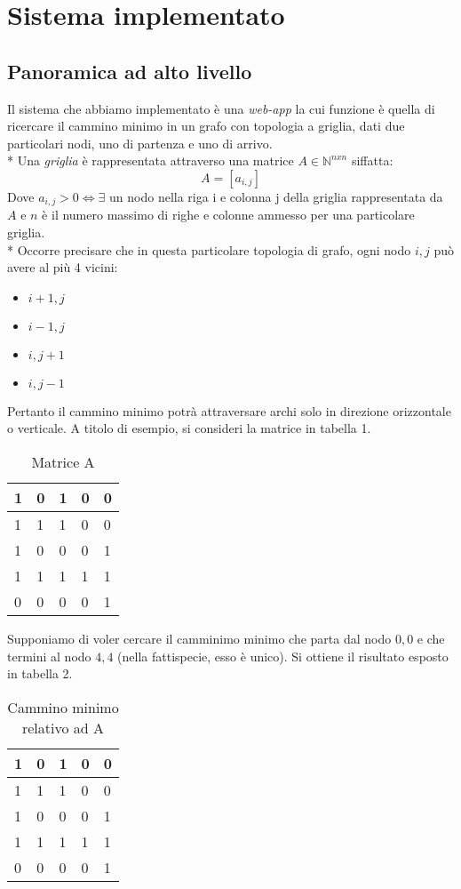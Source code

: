 \chapter{Sistema implementato}
\section{Panoramica ad alto livello}
Il sistema che abbiamo implementato \`e una \emph{web-app} la cui funzione \`e quella di ricercare il cammino minimo in un grafo con topologia a griglia, dati due particolari nodi, uno di partenza e uno di arrivo.\\*
Una \emph{griglia} \`e rappresentata attraverso una matrice $A \in \mathbb{N}^{n x n}$ siffatta:
\[ A=[a_{i,j}] \]
Dove $a_{i,j}>0 \iff \exists $ un nodo nella riga i e colonna j della griglia rappresentata da $A$ e $n$ \`e il numero massimo di righe e colonne ammesso per una particolare griglia.\\*
Occorre precisare che in questa particolare topologia di grafo, ogni nodo $i,j$ pu\`o avere al pi\`u 4 vicini:
\begin{itemize}
	\item $i+1,j$
	\item $i-1,j$
	\item $i,j+1$
	\item $i,j-1$
\end{itemize} 
Pertanto il cammino minimo potr\`a attraversare archi solo in direzione orizzontale o verticale.\newpage
A titolo di esempio, si consideri la matrice in tabella 1.
\begin{table}[]
	\centering
	\caption{Matrice A}
	\label{my-label}
	\begin{tabular}{|l|l|l|l|l|}
		\hline
		1 & 0 & 1 & 0 & 0 \\ \hline
		1 & 1 & 1 & 0 & 0 \\ \hline
		1 & 0 & 0 & 0 & 1 \\ \hline
		1 & 1 & 1 & 1 & 1 \\ \hline
		0 & 0 & 0 & 0 & 1 \\ \hline
	\end{tabular}
\end{table}
Supponiamo di voler cercare il camminimo minimo che parta dal nodo $0,0$ e che termini al nodo $4,4$ (nella fattispecie, esso \`e unico).
Si ottiene il risultato esposto in tabella 2.
\begin{table}[]
	\centering
	\caption{Cammino minimo relativo ad A}
	\label{my-label}
	\begin{tabular}{|l|l|l|l|l|}
		\hline
		\cellcolor[HTML]{68CBD0}1 & 0 & 1 & 0 & 0                         \\ \hline
		\cellcolor[HTML]{68CBD0}1 & 1 & 1 & 0 & 0                         \\ \hline
		\cellcolor[HTML]{68CBD0}1 & 0 & 0 & 0 & 1                         \\ \hline
		\rowcolor[HTML]{68CBD0} 
		1                         & 1 & 1 & 1 & 1                         \\ \hline
		0                         & 0 & 0 & 0 & \cellcolor[HTML]{68CBD0}1 \\ \hline
	\end{tabular}
\end{table}
